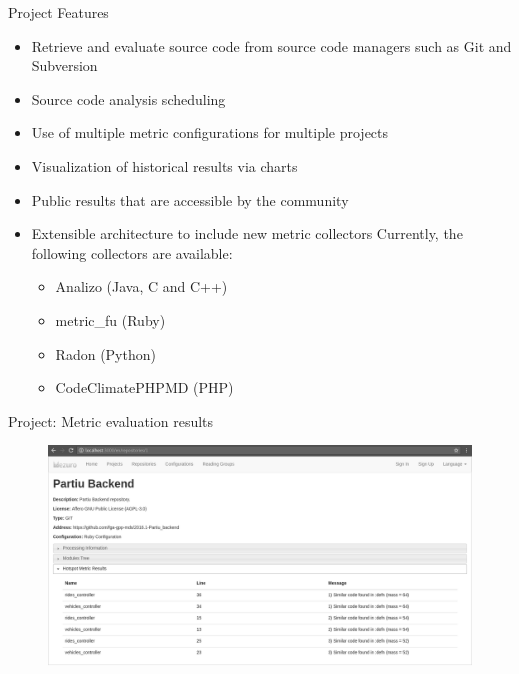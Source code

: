 \begin{block}{Project Features}
    \begin{itemize}
        \item Retrieve and evaluate source code from source code managers
            such as Git and Subversion
        \item Source code analysis scheduling
        \item Use of multiple metric configurations for multiple
            projects
        \item Visualization of historical results via charts
        \item Public results that are accessible by the community
        \item Extensible architecture to include new metric collectors
            Currently, the following collectors are available:
            \begin{itemize}
							\item Analizo (Java, C and C++)
							\item metric\_fu (Ruby)
							\item Radon (Python)
							\item CodeClimatePHPMD (PHP)
            \end{itemize}
    \end{itemize}
\end{block}

\begin{block}{Project: Metric evaluation results}
    \begin{figure}
        \begin{center}
            \includegraphics[width=\textwidth]{figures/MetricProcessing.png}
                \label{fig:feature1}
        \end{center}
    \end{figure}
\end{block}

